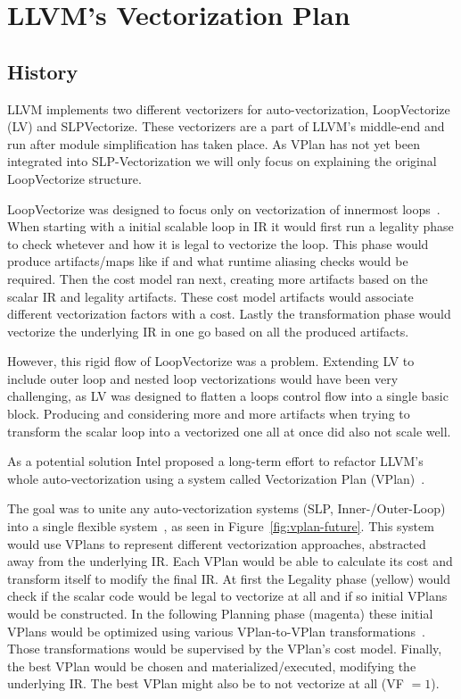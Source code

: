 \documentclass[sigplan,11pt,nonacm]{acmart}
\begin{document}
\section{LLVM's Vectorization Plan}
\label{sec:vplan}

\subsection{History}
LLVM implements two different vectorizers for auto-vectorization, LoopVectorize (LV)
and SLPVectorize. These vectorizers are a part of LLVM's middle-end and run after module 
simplification has taken place. As VPlan has not yet been integrated into SLP-Vectorization 
we will only focus on explaining the original LoopVectorize structure.

LoopVectorize was designed to focus only on vectorization of innermost loops~\cite{llvmintrvplan}. 
When starting with a initial scalable loop in IR it would first run a legality phase to check 
whetever and how it is legal to vectorize the loop. This phase would produce artifacts/maps like if 
and what runtime aliasing checks would be required. Then the cost model ran next, creating more 
artifacts based on the scalar IR and legality artifacts. These cost model artifacts would 
associate different vectorization factors with a cost. Lastly the transformation phase would 
vectorize the underlying IR in one go based on all the produced artifacts.

However, this rigid flow of LoopVectorize was a problem. Extending LV to include outer loop 
and nested loop vectorizations would have been very challenging, as LV was designed to flatten a
loops control flow into a single basic block. Producing and considering more and 
more artifacts when trying to transform the scalar loop into a vectorized one all at once did also 
not scale well.

As a potential solution Intel proposed a long-term effort to refactor LLVM's whole auto-vectorization
using a system called Vectorization Plan (VPlan)~\cite{llvmextloopvec}.

The goal was to unite any auto-vectorization systems (SLP, Inner-/Outer-Loop) into a single flexible
system~\cite{llvmintrvplan,llvmvplanstate}, as seen in Figure~\ref{fig:vplan-future}. This system would use VPlans to represent different 
vectorization approaches, abstracted away from the underlying IR. Each VPlan would be able to 
calculate its cost and transform itself to modify the final IR. At first the Legality 
phase (yellow) would check if the scalar code would be legal to vectorize at all and if so initial 
VPlans would be constructed. In the following Planning phase (magenta) these initial VPlans would 
be optimized using various VPlan-to-VPlan transformations~\cite{llvmouterloopstatus}. 
Those transformations would be supervised 
by the VPlan's cost model. Finally, the best VPlan would be chosen and materialized/executed, 
modifying the underlying IR. The best VPlan might also be to not vectorize at all (VF $=1$).
\end{document}
